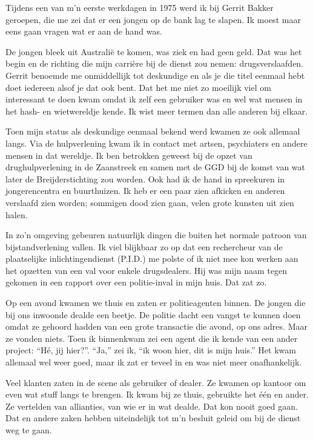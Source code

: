 \documentclass[10pt,twoside, openright]{memoir}
\begin{document}
Tijdens een van m’n eerste werkdagen in 1975 werd ik bij Gerrit Bakker geroepen, die me zei dat er een jongen op de bank lag te slapen. Ik moest maar eens gaan vragen wat er aan de hand was. 

De jongen bleek uit Australië te komen, was ziek en had geen geld. Dat was het begin en de richting die mijn carrière bij de dienst zou nemen: drugsverslaafden. Gerrit benoemde me onmiddellijk tot deskundige en als je die titel eenmaal hebt doet iedereen alsof je dat ook bent. Dat het me niet zo moeilijk viel om interessant te doen kwam omdat ik zelf een gebruiker was en wel wat mensen in het hash- en wietwereldje kende. Ik wist meer termen dan alle anderen bij elkaar. 

Toen mijn status als deskundige eenmaal bekend werd kwamen ze ook allemaal langs. Via de hulpverlening kwam ik in contact met artsen, psychiaters en andere mensen in dat wereldje. Ik ben betrokken geweest bij de opzet van drughulpverlening in de Zaanstreek en samen met de GGD bij de komst van wat later de Breijderstichting zou worden. Ook had ik de hand in spreekuren in jongerencentra en buurthuizen. Ik heb er een paar zien afkicken en anderen verslaafd zien worden; sommigen dood zien gaan, velen grote kunsten uit zien halen. 

In zo’n omgeving gebeuren natuurlijk dingen die buiten het normale patroon van bijstandverlening vallen. Ik viel blijkbaar zo op dat een rechercheur van de plaatselijke  inlichtingendienst (P.I.D.) me polste of ik niet mee kon werken aan het opzetten van een val voor enkele drugsdealers. Hij was mijn naam tegen gekomen in een rapport over een politie-inval in mijn huis. Dat zat zo. 

Op een avond kwamen we thuis en zaten er politieagenten binnen. De jongen die bij ons inwoonde dealde een beetje. De politie dacht een vangst te kunnen doen omdat ze gehoord hadden van een grote transactie die avond, op ons adres. Maar ze vonden niets. Toen ik binnenkwam zei een agent die ik kende van een ander project: ``Hé, jij hier?''. ``Ja,'' zei ik, ``ik woon hier, dit is mijn huis.'' Het kwam allemaal wel weer goed, maar ik zat er teveel in en was niet meer onafhankelijk. 

Veel klanten zaten in de scene als gebruiker of dealer. Ze kwamen op kantoor om even wat stuff langs te brengen. Ik kwam bij ze thuis, gebruikte het één en ander. Ze vertelden van allianties, van wie er in wat dealde. Dat kon nooit goed gaan. Dat en andere zaken hebben uiteindelijk tot m’n besluit geleid om bij de dienst weg te gaan. 
\end{document}
